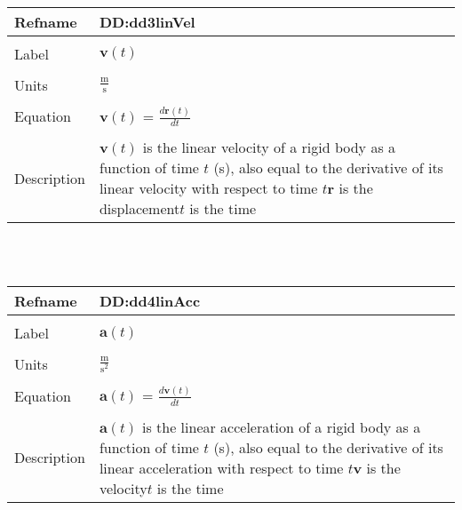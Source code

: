 \documentclass[12pt]{article}
\begin{document}
~\newline
\noindent \begin{minipage}{\textwidth}
\begin{tabular}{p{} p{}}
\toprule \textbf{Refname} & \textbf{DD:dd3linVel}
\label{DD:dd3linVel}
\\ \midrule \\
Label & $\mathbf{v}(t)$
\\ \midrule \\
Units & $\frac{\text{m}}{\text{s}}$
\\ \midrule \\
Equation & $\mathbf{v}(t)$ = $\frac{d\mathbf{r}(t)}{dt}$
\\ \midrule \\
Description & $\mathbf{v}(t)$ is the linear velocity of a rigid body as a function of time $t$ (s), also equal to the derivative of its linear velocity with respect to time $t$\newline$\mathbf{r}$ is the displacement\newline$t$ is the time
\\ \bottomrule \end{tabular}
\end{minipage}\\
~\newline
\noindent \begin{minipage}{\textwidth}
\begin{tabular}{p{} p{}}
\toprule \textbf{Refname} & \textbf{DD:dd4linAcc}
\label{DD:dd4linAcc}
\\ \midrule \\
Label & $\mathbf{a}(t)$
\\ \midrule \\
Units & $\frac{\text{m}}{\text{s}^{2}}$
\\ \midrule \\
Equation & $\mathbf{a}(t)$ = $\frac{d\mathbf{v}(t)}{dt}$
\\ \midrule \\
Description & $\mathbf{a}(t)$ is the linear acceleration of a rigid body as a function of time $t$ (s), also equal to the derivative of its linear acceleration with respect to time $t$\newline$\mathbf{v}$ is the velocity\newline$t$ is the time
\\ \bottomrule \end{tabular}
\end{minipage}\\
\end{document}
